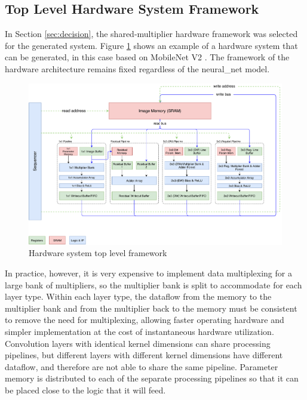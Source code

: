 \documentclass{uw-ece-wkrpt}
\begin{document}
\subsection{Top Level Hardware System Framework}\label{sec:top_level_framework}

In Section \ref{sec:decision}, the shared-multiplier hardware framework was selected for the generated system. Figure \ref{fig:top_level} shows an example of a hardware system that can be generated, in this case based on MobileNet V2 \cite{Howard2017MobileNets:-Eff}. The framework of the hardware architecture remains fixed regardless of the \gls{neural_net} model.

\begin{figure}
\centering
\includegraphics[width=\textwidth]{figures/top_level}
\caption{Hardware system top level framework}\label{fig:top_level}
\end{figure}

In practice, however, it is very expensive to implement data multiplexing for a large bank of multipliers, so the multiplier bank is split to accommodate for each layer type. Within each layer type, the dataflow from the memory to the multiplier bank and from the multiplier back to the memory must be consistent to remove the need for multiplexing, allowing faster operating hardware and simpler implementation at the cost of instantaneous hardware utilization. Convolution layers with identical \gls{kernel} dimensions can share processing pipelines, but different layers with different \gls{kernel} dimensions have different dataflow, and therefore are not able to share the same pipeline. Parameter memory is distributed to each of the separate processing pipelines so that it can be placed close to the logic that it will feed.
\end{document}
